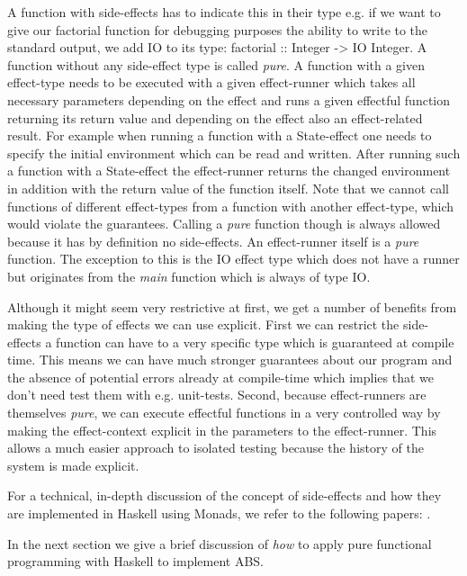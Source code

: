 A function with side-effects has to indicate this in their type e.g. if we want to give our factorial function for debugging purposes the ability to write to the standard output, we add IO to its type: factorial :: Integer -> IO Integer. A function without any side-effect type is called \textit{pure}. A function with a given effect-type needs to be executed with a given effect-runner which takes all necessary parameters depending on the effect and runs a given effectful function returning its return value and depending on the effect also an effect-related result. For example when running a function with a State-effect one needs to specify the initial environment which can be read and written. After running such a function with a State-effect the effect-runner returns the changed environment in addition with the return value of the function itself. Note that we cannot call functions of different effect-types from a function with another effect-type, which would violate the guarantees. Calling a \textit{pure} function though is always allowed because it has by definition no side-effects. An effect-runner itself is a \textit{pure} function. The exception to this is the IO effect type which does not have a runner but originates from the \textit{main} function which is always of type IO.

Although it might seem very restrictive at first, we get a number of benefits from making the type of effects we can use explicit. First we can restrict the side-effects a function can have to a very specific type which is guaranteed at compile time. This means we can have much stronger guarantees about our program and the absence of potential errors already at compile-time which implies that we don't need test them with e.g. unit-tests. Second, because effect-runners are themselves \textit{pure}, we can execute effectful functions in a very controlled way by making the effect-context explicit in the parameters to the effect-runner. This allows a much easier approach to isolated testing because the history of the system is made explicit.

For a technical, in-depth discussion of the concept of side-effects and how they are implemented in Haskell using Monads, we refer to the following papers: \cite{moggi_computational_1989, wadler_essence_1992, wadler_monads_1995, wadler_how_1997, jones_tackling_2002}.

In the next section we give a brief discussion of \textit{how} to apply pure functional programming with Haskell to implement ABS.